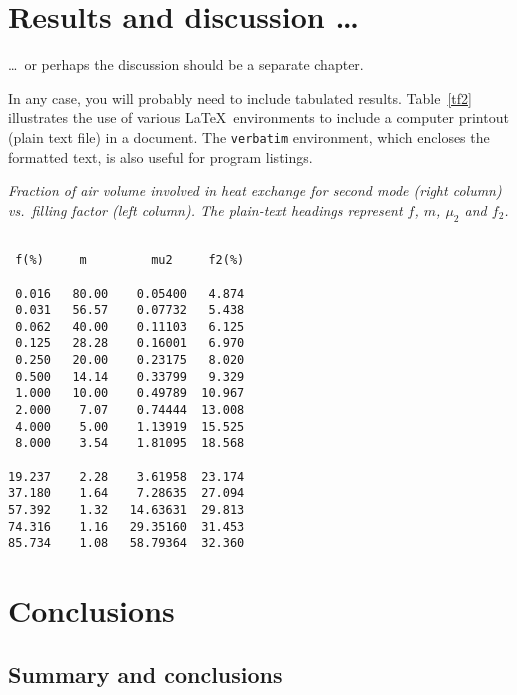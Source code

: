 \documentclass[12pt,openany,a4paper]{book}
\renewcommand{\baselinestretch}{1.2}	%
\newcommand{\tab}[1]  {Table~\ref{#1}}		%
\begin{document}
\chapter{Results and discussion \ldots}

\ldots\ or perhaps the discussion should be a separate chapter.

In any case, you will probably need to include tabulated results.
\tab{tf2} illustrates the use of various \LaTeX\ environments to
include a computer printout (plain text file) in a document.  The
\texttt{verbatim} environment, which encloses the formatted text, is
also useful for program listings.

\begin{table}\renewcommand{\baselinestretch}{1.0}
\caption{\sl Fraction of air volume involved in heat exchange for
second mode (right column) vs.\ filling factor (left column).  The
plain-text headings represent $f$, $m$, $\mu_2$ and $f_2$.}
\label{tf2}

\begin{center}
\begin{minipage}[c]{2.85in}\small\normalsize
\begin{verbatim}

 f(%)     m         mu2     f2(%)

 0.016   80.00    0.05400   4.874
 0.031   56.57    0.07732   5.438
 0.062   40.00    0.11103   6.125
 0.125   28.28    0.16001   6.970
 0.250   20.00    0.23175   8.020
 0.500   14.14    0.33799   9.329
 1.000   10.00    0.49789  10.967
 2.000    7.07    0.74444  13.008
 4.000    5.00    1.13919  15.525
 8.000    3.54    1.81095  18.568

19.237    2.28    3.61958  23.174
37.180    1.64    7.28635  27.094
57.392    1.32   14.63631  29.813
74.316    1.16   29.35160  31.453
85.734    1.08   58.79364  32.360
\end{verbatim}
\end{minipage}
\end{center}
\end{table}

\chapter{Conclusions}

\section{Summary and conclusions}
\end{document}
